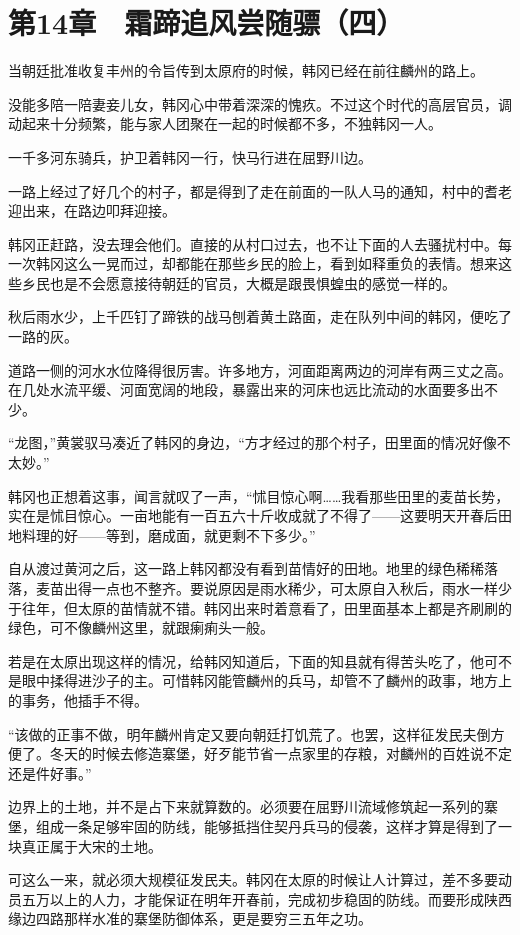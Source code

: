 \section{第14章　霜蹄追风尝随骠（四）}

当朝廷批准收复丰州的令旨传到太原府的时候，韩冈已经在前往麟州的路上。

没能多陪一陪妻妾儿女，韩冈心中带着深深的愧疚。不过这个时代的高层官员，调动起来十分频繁，能与家人团聚在一起的时候都不多，不独韩冈一人。

一千多河东骑兵，护卫着韩冈一行，快马行进在屈野川边。

一路上经过了好几个的村子，都是得到了走在前面的一队人马的通知，村中的耆老迎出来，在路边叩拜迎接。

韩冈正赶路，没去理会他们。直接的从村口过去，也不让下面的人去骚扰村中。每一次韩冈这么一晃而过，却都能在那些乡民的脸上，看到如释重负的表情。想来这些乡民也是不会愿意接待朝廷的官员，大概是跟畏惧蝗虫的感觉一样的。

秋后雨水少，上千匹钉了蹄铁的战马刨着黄土路面，走在队列中间的韩冈，便吃了一路的灰。

道路一侧的河水水位降得很厉害。许多地方，河面距离两边的河岸有两三丈之高。在几处水流平缓、河面宽阔的地段，暴露出来的河床也远比流动的水面要多出不少。

“龙图，”黄裳驭马凑近了韩冈的身边，“方才经过的那个村子，田里面的情况好像不太妙。”

韩冈也正想着这事，闻言就叹了一声，“怵目惊心啊……我看那些田里的麦苗长势，实在是怵目惊心。一亩地能有一百五六十斤收成就了不得了——这要明天开春后田地料理的好——等到，磨成面，就更剩不下多少。”

自从渡过黄河之后，这一路上韩冈都没有看到苗情好的田地。地里的绿色稀稀落落，麦苗出得一点也不整齐。要说原因是雨水稀少，可太原自入秋后，雨水一样少于往年，但太原的苗情就不错。韩冈出来时着意看了，田里面基本上都是齐刷刷的绿色，可不像麟州这里，就跟瘌痢头一般。

若是在太原出现这样的情况，给韩冈知道后，下面的知县就有得苦头吃了，他可不是眼中揉得进沙子的主。可惜韩冈能管麟州的兵马，却管不了麟州的政事，地方上的事务，他插手不得。

“该做的正事不做，明年麟州肯定又要向朝廷打饥荒了。也罢，这样征发民夫倒方便了。冬天的时候去修造寨堡，好歹能节省一点家里的存粮，对麟州的百姓说不定还是件好事。”

边界上的土地，并不是占下来就算数的。必须要在屈野川流域修筑起一系列的寨堡，组成一条足够牢固的防线，能够抵挡住契丹兵马的侵袭，这样才算是得到了一块真正属于大宋的土地。

可这么一来，就必须大规模征发民夫。韩冈在太原的时候让人计算过，差不多要动员五万以上的人力，才能保证在明年开春前，完成初步稳固的防线。而要形成陕西缘边四路那样水准的寨堡防御体系，更是要穷三五年之功。

